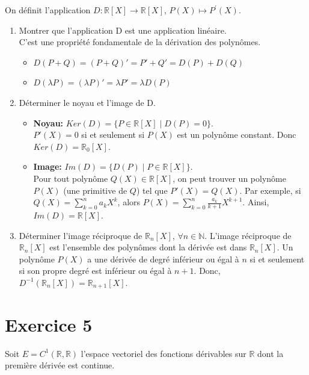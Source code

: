 \documentclass[french]{yLectureNote}
\begin{document}
On définit l'application $D:\mathbb{R}[X]\rightarrow\mathbb{R}[X]$, $P(X)\mapsto P^{\prime}(X)$.

\begin{enumerate}
    \item Montrer que l'application D est une application linéaire. \\
   C'est une propriété fondamentale de la dérivation des polynômes.
    \begin{itemize}
        \item $D(P+Q) = (P+Q)' = P'+Q' = D(P)+D(Q)$
        \item $D(\lambda P) = (\lambda P)' = \lambda P' = \lambda D(P)$
    \end{itemize}

    \item Déterminer le noyau et l'image de D.
    \begin{itemize}
        \item \textbf{Noyau:} $Ker(D) = \{ P \in \mathbb{R}[X] \mid D(P)=0 \}$. \\
        $P'(X)=0$ si et seulement si $P(X)$ est un polynôme constant. Donc $Ker(D) = \mathbb{R}_0[X]$.
        \item \textbf{Image:} $Im(D) = \{ D(P) \mid P \in \mathbb{R}[X] \}$. \\
        Pour tout polynôme $Q(X) \in \mathbb{R}[X]$, on peut trouver un polynôme $P(X)$ (une primitive de $Q$) tel que $P'(X)=Q(X)$. Par exemple, si $Q(X) = \sum_{k=0}^{n} a_k X^k$, alors $P(X) = \sum_{k=0}^{n} \frac{a_k}{k+1}X^{k+1}$.
        Ainsi, $Im(D) = \mathbb{R}[X]$.
    \end{itemize}

    \item Déterminer l'image réciproque de $\mathbb{R}_{n}[X]$, $\forall n\in\mathbb{N}.$
    L'image réciproque de $\mathbb{R}_n[X]$ est l'ensemble des polynômes dont la dérivée est dans $\mathbb{R}_n[X]$.
    Un polynôme $P(X)$ a une dérivée de degré inférieur ou égal à $n$ si et seulement si son propre degré est inférieur ou égal à $n+1$.
    Donc, $D^{-1}(\mathbb{R}_{n}[X]) = \mathbb{R}_{n+1}[X]$.
\end{enumerate}

\section{Exercice 5}

Soit $E=C^{1}(\mathbb{R},\mathbb{R})$ l'espace vectoriel des fonctions dérivables sur $\mathbb{R}$ dont la première dérivée est continue.
\end{document}
